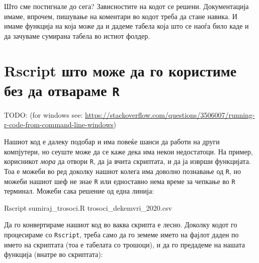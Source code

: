 \documentclass[
]{book}
\newenvironment{Shaded}{\begin{snugshade}}{\end{snugshade}}
\newcommand{\ExtensionTok}[1]{#1}
\newcommand{\NormalTok}[1]{#1}
\begin{document}
Што сме постигнале до сега? Зависностите на кодот се решени. Документација имаме, впрочем, пишување на коментари во кодот треба да стане навика. И имаме функција на која може да и дадеме табела која што се наоѓа било каде и да зачуваме сумирана табела во истиот фолдер.

\hypertarget{rscript-ux448ux442ux43e-ux43cux43eux436ux435-ux434ux430-ux433ux43e-ux43aux43eux440ux438ux441ux442ux438ux43cux435-ux431ux435ux437-ux434ux430-ux43eux442ux432ux430ux440ux430ux43cux435-r}{%
\section{\texorpdfstring{Rscript што може да го користиме без да отвараме \texttt{R}}{Rscript што може да го користиме без да отвараме R}}\label{rscript-ux448ux442ux43e-ux43cux43eux436ux435-ux434ux430-ux433ux43e-ux43aux43eux440ux438ux441ux442ux438ux43cux435-ux431ux435ux437-ux434ux430-ux43eux442ux432ux430ux440ux430ux43cux435-r}}

TODO:
(for windows see: \url{https://stackoverflow.com/questions/3506007/running-r-code-from-command-line-windows})

Нашиот код е далеку подобар и има повеќе шанси да работи на други компјутери, но сеуште може да се каже дека има некои недостатоци. На пример, корисникот \emph{мора} да отвори \texttt{R}, да ја вчита скриптата, и да ја изврши функцијата. Тоа е можеби во ред доколку нашиот колега има доволно познавање од \texttt{R}, но можеби нашиот шеф не знае \texttt{R} или едноставно нема време за чепкање во \texttt{R} терминал. Можеби сака решение од една линија:

\begin{Shaded}
\begin{Highlighting}[]
\ExtensionTok{Rscript}\NormalTok{ sumiraj\_trosoci.R trosoci\_dekemvri\_2020.csv}
\end{Highlighting}
\end{Shaded}

Да го конвертираме нашиот код во ваква скрипта е лесно. Доколку кодот го процесираме со \texttt{Rscript}, треба само да го земеме името на фајлот даден по името на скриптата (тоа е табелата со трошоци), и да го предадеме на нашата функција (внатре во скриптата):
\end{document}
